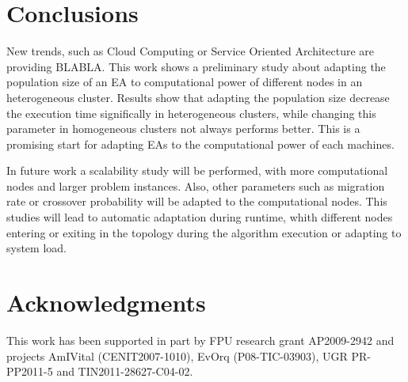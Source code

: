 \documentclass{sig-alternate}
\begin{document}
%



\section{Conclusions}
New trends, such as Cloud Computing or Service Oriented Architecture are providing BLABLA. This work shows a preliminary study about adapting the population size of an EA to computational power of different nodes in an heterogeneous cluster. Results show that adapting the population size decrease the execution time significally in heterogeneous clusters, while changing this parameter in homogeneous clusters not always performs better. This is a promising start for adapting EAs to the computational power of each machines.

In future work a scalability study will be performed, with more computational nodes and larger problem instances. Also, other parameters such as migration rate or crossover probability will be adapted to the computational nodes. This studies will lead to automatic adaptation during runtime, whith different nodes entering or exiting in the topology during the algorithm execution or adapting to system load.


\section{Acknowledgments}
This work has been supported in part by FPU research grant AP2009-2942 and projects AmIVital (CENIT2007-1010), EvOrq (P08-TIC-03903), UGR PR-PP2011-5 and TIN2011-28627-C04-02.

%



\end{document}
